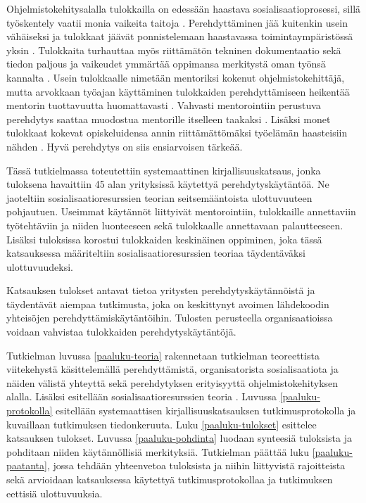 \documentclass[utf8]{gradu3}
\begin{document}
Ohjelmistokehitysalalla tulokkailla on edessään haastava sosialisaatioprosessi, sillä työskentely vaatii monia vaikeita taitoja
%
\parencites%
    [][]{swebok}%
    {gregory-ym-2020}%
    {begel-simon-2008-all-over-again}%
\relax.
%
Perehdyttäminen jää kuitenkin usein vähäiseksi ja tulokkaat jäävät ponnistelemaan haastavassa toimintaympäristössä yksin %
\parencites%
    {buchan-ym-2019}%
    {dagenais-ym-2010}%
    {begel-simon-2008}%
\relax.
%
Tulokkaita turhauttaa myös riittämätön tekninen dokumentaatio \parencite{ju-ym-2021} sekä tiedon paljous ja vaikeudet ymmärtää oppimansa merkitystä oman työnsä kannalta \parencite{viviani-murphy-2019}. Usein tulokkaalle nimetään mentoriksi kokenut ohjelmistokehittäjä, mutta arvokkaan työajan käyttäminen tulokkaiden perehdyttämiseen heikentää mentorin tuottavuutta huomattavasti \parencite{medeiros-2021}. Vahvasti mentorointiin perustuva perehdytys saattaa muodostua mentorille itselleen taakaksi \parencite{viviani-murphy-2019}. Lisäksi monet tulokkaat kokevat opiskeluidensa annin riittämättömäksi työelämän haasteisiin nähden \parencite{craig-ym-2018}. Hyvä perehdytys on siis ensiarvoisen tärkeää.

Tässä tutkielmassa toteutettiin systemaattinen kirjallisuuskatsaus, jonka tuloksena havaittiin 45 alan yrityksissä käytettyä perehdytyskäytäntöä. Ne jaoteltiin sosialisaatioresurssien teorian \textcite{saks-gruman-2012} seitsemääntoista ulottuvuuteen pohjautuen. Useimmat käytännöt liittyivät mentorointiin, tulokkaille annettaviin työtehtäviin ja niiden luonteeseen sekä tulokkaalle annettavaan palautteeseen. Lisäksi tuloksissa korostui tulokkaiden keskinäinen oppiminen, joka tässä katsauksessa määriteltiin sosialisaatioresurssien teoriaa täydentäväksi ulottuvuudeksi.

Katsauksen tulokset antavat tietoa yritysten perehdytyskäytännöistä ja täydentävät aiempaa tutkimusta, joka on keskittynyt avoimen lähdekoodin yhteisöjen perehdyttämiskäytäntöihin. Tulosten perusteella organisaatioissa voidaan vahvistaa tulokkaiden perehdytyskäytäntöjä.

Tutkielman luvussa \ref{paaluku-teoria} rakennetaan tutkielman teoreettista viitekehystä käsittelemällä perehdyttämistä, organisatorista sosialisaatiota ja näiden välistä yhteyttä sekä perehdytyksen erityisyyttä ohjelmistokehityksen alalla. Lisäksi esitellään sosialisaatioresurssien teoria \parencite{saks-gruman-2012}. Luvussa \ref{paaluku-protokolla} esitellään systemaattisen kirjallisuuskatsauksen tutkimusprotokolla ja kuvaillaan tutkimuksen tiedonkeruuta. Luku \ref{paaluku-tulokset} esittelee katsauksen tulokset. Luvussa \ref{paaluku-pohdinta} luodaan synteesiä tuloksista ja pohditaan niiden käytännöllisiä merkityksiä. Tutkielman päättää luku \ref{paaluku-paatanta}, jossa tehdään yhteenvetoa tuloksista ja niihin liittyvistä rajoitteista sekä arvioidaan katsauksessa käytettyä tutkimusprotokollaa ja tutkimuksen eettisiä ulottuvuuksia.
\end{document}
